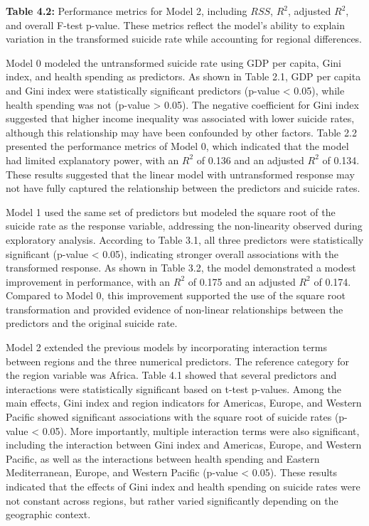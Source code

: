 \documentclass[
]{article}
\begin{document}
\textbf{Table 4.2:} Performance metrics for Model 2, including \(RSS\),
\(R^2\), adjusted \(R^2\), and overall F-test p-value. These metrics
reflect the model's ability to explain variation in the transformed
suicide rate while accounting for regional differences.

\hfill\break

Model 0 modeled the untransformed suicide rate using GDP per capita,
Gini index, and health spending as predictors. As shown in Table 2.1,
GDP per capita and Gini index were statistically significant predictors
(p-value \textless{} 0.05), while health spending was not (p-value
\textgreater{} 0.05). The negative coefficient for Gini index suggested
that higher income inequality was associated with lower suicide rates,
although this relationship may have been confounded by other factors.
Table 2.2 presented the performance metrics of Model 0, which indicated
that the model had limited explanatory power, with an \(R^2\) of 0.136
and an adjusted \(R^2\) of 0.134. These results suggested that the
linear model with untransformed response may not have fully captured the
relationship between the predictors and suicide rates.

Model 1 used the same set of predictors but modeled the square root of
the suicide rate as the response variable, addressing the non-linearity
observed during exploratory analysis. According to Table 3.1, all three
predictors were statistically significant (p-value \textless{} 0.05),
indicating stronger overall associations with the transformed response.
As shown in Table 3.2, the model demonstrated a modest improvement in
performance, with an \(R^2\) of 0.175 and an adjusted \(R^2\) of 0.174.
Compared to Model 0, this improvement supported the use of the square
root transformation and provided evidence of non-linear relationships
between the predictors and the original suicide rate.

Model 2 extended the previous models by incorporating interaction terms
between regions and the three numerical predictors. The reference
category for the region variable was Africa. Table 4.1 showed that
several predictors and interactions were statistically significant based
on t-test p-values. Among the main effects, Gini index and region
indicators for Americas, Europe, and Western Pacific showed significant
associations with the square root of suicide rates (p-value \textless{}
0.05). More importantly, multiple interaction terms were also
significant, including the interaction between Gini index and Americas,
Europe, and Western Pacific, as well as the interactions between health
spending and Eastern Mediterranean, Europe, and Western Pacific (p-value
\textless{} 0.05). These results indicated that the effects of Gini
index and health spending on suicide rates were not constant across
regions, but rather varied significantly depending on the geographic
context.
\end{document}
